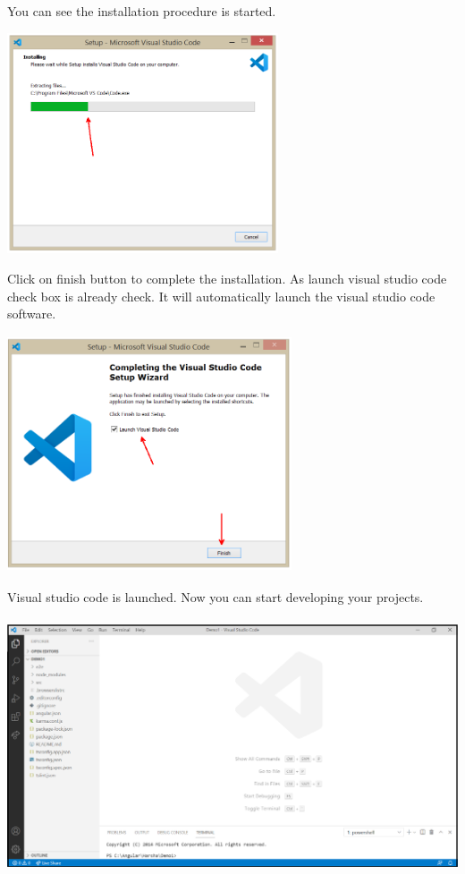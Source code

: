 \documentclass{article}
\begin{document}
 
   You can see the installation procedure is started.
 

\begin{center}
	\noindent \includegraphics*[width=3.16in, height=2.57in]{IMG-06-23}
\end{center}

\noindent 

\newpage 
\noindent Click on finish button to complete the installation. As launch visual studio code check box is already check. It will automatically launch the visual studio code software.
 

\begin{center}
	\noindent \includegraphics*[width=3.31in, height=2.76in]{IMG-06-24}
\end{center}

 
   Visual studio code is launched. Now you can start developing your projects.
 

\begin{center}
	\noindent \includegraphics*[width=5.48in, height=2.95in]{IMG-06-25}
\end{center}
\end{document}
